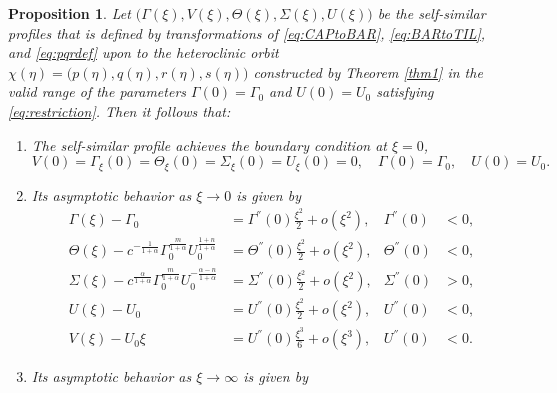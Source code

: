 \documentclass[a4paper,11pt]{article}
\newtheorem{proposition}{Proposition}[section]
\theoremstyle{remark}
\begin{document}
%
%
\begin{proposition} \label{prop:ss}
Let $\big(\Gamma(\xi),V(\xi),\Theta(\xi),\Sigma(\xi),U(\xi)\big)$ be the self-similar profiles that is defined by transformations of \eqref{eq:CAPtoBAR}, \eqref{eq:BARtoTIL}, and \eqref{eq:pqrdef} upon to the heteroclinic orbit $\chi(\eta)=\big(p(\eta),q(\eta),r(\eta),s(\eta)\big)$ constructed by Theorem \ref{thm1} in the valid range of the parameters $\Gamma(0)=\Gamma_0$ and $U(0)=U_0$ satisfying \eqref{eq:restriction}. Then it follows that:
 \begin{enumerate}
  \item[(i)] The self-similar profile achieves the boundary condition at $\xi=0$,
    \begin{equation*}
    {V}(0) = \Gamma_\xi(0) = \Theta_\xi(0)=\Sigma_\xi(0) = {U}_\xi(0)=0, \quad \Gamma(0)=\Gamma_0, \quad U(0)=U_0.
  \end{equation*}
  \item[(ii)] Its asymptotic behavior as $\xi \rightarrow 0$ is given by
  \begin{equation} \label{eq:ss_asymp0}
  \begin{aligned}
    \Gamma(\xi) -\Gamma_0 &= \Gamma^{''}(0)\frac{\xi^2}{2} + o(\xi^2), & \Gamma^{''}(0)&<0,\\
    \Theta(\xi) - c^{-\frac{1}{1+\alpha}}\Gamma_0^{\frac{m}{1+\alpha}} U_0^{\frac{1+n}{1+\alpha}} &= \Theta^{''}(0)\frac{\xi^2}{2} + o(\xi^2), & \Theta^{''}(0)&<0,\\
    \Sigma(\xi) - c^{\frac{\alpha}{1+\alpha}}\Gamma_0^{\frac{m}{1+\alpha}} U_0^{-\frac{\alpha-n}{1+\alpha}} &= \Sigma^{''}(0)\frac{\xi^2}{2} + o(\xi^2), & \Sigma^{''}(0)&>0, \\
    U(\xi) - U_0 &= U^{''}(0)\frac{\xi^2}{2} + o(\xi^2), & U^{''}(0)&<0,\\
    V(\xi) - U_0\xi &= U^{''}(0)\frac{\xi^3}{6} + o(\xi^3), & U^{''}(0)&<0.
  \end{aligned}
  \end{equation}
  \item[(iii)] Its asymptotic behavior as $\xi \rightarrow \infty$ is given by\\

\end{enumerate}
\end{proposition}
\end{document}
